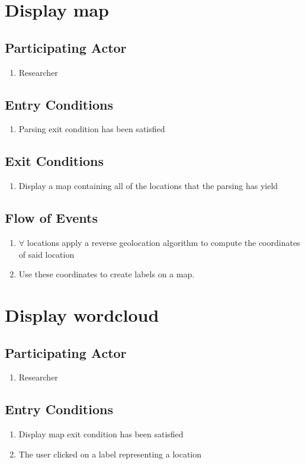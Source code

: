 \documentclass[21pt]{article}
\begin{document}
\section{Display map}
\subsection{Participating Actor}
\begin{enumerate}
\item Researcher
\end{enumerate}
\subsection{Entry Conditions}
\begin{enumerate}
\item Parsing exit condition has been satisfied
\end{enumerate}
\subsection{Exit Conditions}
\begin{enumerate}
\item Display a map containing all of the locations that the parsing has yield
\end{enumerate}
\subsection{Flow of Events}
\begin{enumerate}
\item $\forall$ locations apply a reverse geolocation algorithm to compute the coordinates of said location
\item Use these coordinates to create labels on a map.
\end{enumerate}


\section{Display wordcloud}
\subsection{Participating Actor}
\begin{enumerate}
\item Researcher
\end{enumerate}
\subsection{Entry Conditions}
\begin{enumerate}
\item Display map exit condition has been satisfied
\item The user clicked on a label representing a location
\end{enumerate}
\end{document}
